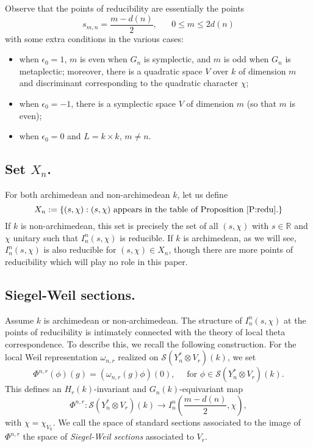 \documentclass[10pt]{amsart}
\theoremstyle{plain}
\numberwithin{equation}{section}
\begin{document}
Observe that the points of reducibility are essentially the points 
\[  s_{m,n} =  \frac{m - d(n)}{2},  \quad \text{ $0 \leq m \leq 2 d(n)$} \]
with some extra conditions in the various cases:
\begin{itemize}
\item when $\epsilon_0 = 1$, $m$ is even when $G_n$ is symplectic, and
  $m$ is odd when $G_n$ is metaplectic; moreover,  there is a quadratic
  space $V$ over $k$ of dimension $m$ and discriminant corresponding
  to the quadratic character $\chi$; 
  \item when $\epsilon_0  = -1$, there is a symplectic space $V$ of dimension $m$ (so that $m$ is even);
  \item when $\epsilon_0 = 0$ and $L = k \times k$, $m \ne n$. 
\end{itemize}

\vskip 5pt

\subsection{\bf Set $X_n$.}
For both archimedean and non-archimedean $k$, let us define
\[
X_n:=\{(s,\chi): (s,\chi) \text{ appears in the table of Proposition
  \ref{P:redu}}.\}
\]
If $k$ is non-archimedean, this set is precisely
the set of all $(s,\chi)$ with $s\in{\mathbb{R}}$ and $\chi$ unitary such that
$I_n^n(s,\chi)$ is reducible. If $k$ is archimedean, as we will see,
$I_n^n(s,\chi)$ is also reducible for $(s,\chi) \in X_n$, though
there are more points of reducibility which will play no
role in this paper.
\vskip 5pt

\subsection{\bf Siegel-Weil sections. }
Assume $k$ is archimedean or  non-archimedean. The structure of
$I^n_n(s,\chi)$ at the points of reducibility is
intimately connected with the theory of local theta
correspondence. To describe this, we recall the following construction.  For
the local Weil representation
$\omega_{n,r}$ realized on $\mathcal{S}(Y_n^* \otimes V_r)(k)$, we set
\[  
\Phi^{n,r}(\phi)(g)  = (\omega_{n,r}(g) \phi)(0), \quad \text{ for
  $\phi \in \mathcal{S}(Y_n^* \otimes V_r)(k)$.} 
\]
This defines an $H_r(k)$-invariant and $G_n(k)$-equivariant map
\[ 
\Phi^{n,r}: \mathcal{S}(Y_n^* \otimes V_r)(k) \longrightarrow
I_n^n(\frac{m - d(n)}{2},\chi),
\]
with $\chi = \chi_{V_0}$. 
We call the space of standard sections associated to the image of
$\Phi^{n,r}$ the space of {\em Siegel-Weil sections} associated to
$V_r$. 
\vskip 5pt
\end{document}

